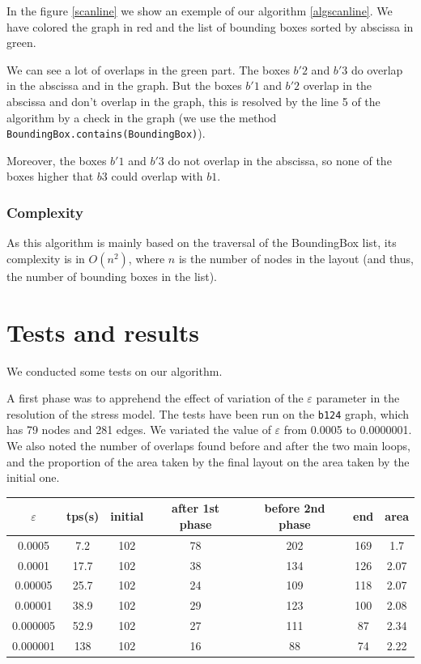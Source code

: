 \documentclass[12pt]{report}
\begin{document}
In the figure \ref{scanline} we show an exemple of our algorithm \ref{algscanline}. We have colored the graph in red and the list of bounding boxes sorted by abscissa in green. 

We can see a lot of overlaps in the green part. The boxes $b'2$ and $b'3$ do overlap in the abscissa and in the graph. But the boxes $b'1$ and $b'2$ overlap in the abscissa and don't overlap in the graph, this is resolved by the line 5 of the algorithm by a check in the graph (we use the method \texttt{BoundingBox.contains(BoundingBox)}).

Moreover, the boxes $b'1$ and $b'3$ do not overlap in the abscissa, so none of the boxes higher that $b3$ could overlap with $b1$.

\subsubsection{Complexity}

As this algorithm is mainly based on the traversal of the BoundingBox list, its complexity is in $O(n^2)$, where $n$ is the number of nodes in the layout (and thus, the number of bounding boxes in the list). 

\section{Tests and results}
We conducted some tests on our algorithm. 

A first phase was to apprehend the effect of variation of the $\varepsilon$ parameter in the resolution of the stress model.
The tests have been run on the \texttt{b124} graph, which has 79 nodes and 281 edges. We variated the value of $\varepsilon$ from 0.0005 to 0.0000001. We also noted the number of overlaps found before and after the two main loops, and the proportion of the area taken by the final layout on the area taken by the initial one.

\begin{center}
\begin{tabular}{|c|c|c|c|c|c|c|}
	\hline 
	 $\varepsilon$ & tps(s) & initial & after 1st phase & before 2nd phase & end & area \\
	\hline
	0.0005 & 7.2 & 102 & 78 & 202 & 169 & 1.7\\
	0.0001 & 17.7 & 102 & 38  & 134 & 126 & 2.07\\
	0.00005 & 25.7 & 102 & 24 & 109 & 118 & 2.07\\
	0.00001 & 38.9 & 102 & 29 & 123 & 100 & 2.08\\
	0.000005 & 52.9 & 102 & 27 & 111 & 87 & 2.34\\
	0.000001 & 138 & 102 & 16 & 88 & 74 & 2.22\\
	\hline
\end{tabular}
\end{center}
\end{document}
